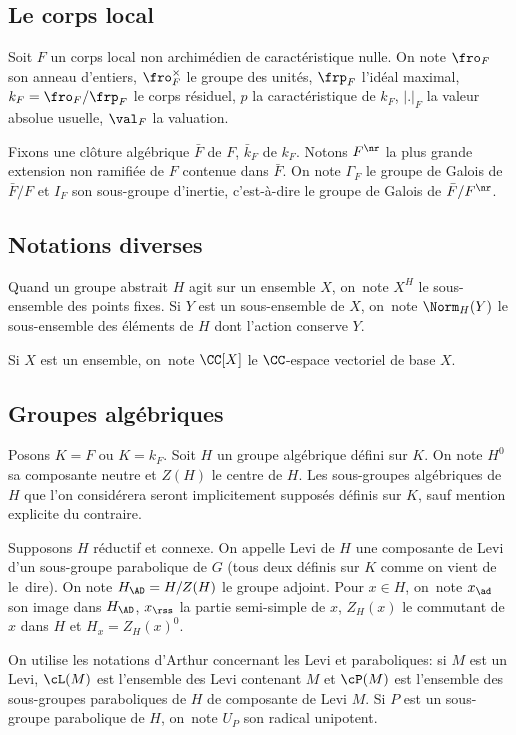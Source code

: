 \subsection{Le corps local}

Soit $F$ un corps local non archimédien de caractéristique nulle. On note $\fro_{F}$ son anneau d'entiers, $\fro_{F}^{\times}$ le groupe des unités, $ \frp_{F}$ l'idéal maximal, $k_{F}=\fro_{F}/\frp_{F}$ le corps résiduel, $p$ la caractéristique de $k_{F}$, $\vert .\vert _{F}$ la valeur absolue usuelle, $\val_{F}$ la valuation.

Fixons une clôture algébrique $\bar{F}$ de $F$, \resp $\bar{k}_{F}$ de $k_{F}$. Notons $F^{\nr}$ la plus grande extension non ramifiée de $F$ contenue dans $\bar{F}$. On note $\Gamma_{F}$ le groupe de Galois de $\bar{F}/ F$ et $I_{F}$ son sous-groupe d'inertie, c'est-à-dire le groupe de Galois de $\bar{F}/F^{\nr}$.

\subsection{Notations diverses}

Quand un groupe abstrait $H$ agit sur un ensemble $X$, on~note $X^{H}$ le sous-ensemble des points fixes. Si $Y$ est un sous-ensemble de $X$, on~note $\Norm_{H}(Y)$ le sous-ensemble des éléments de $H$ dont l'action conserve $Y$.

Si $X$ est un ensemble, on~note $\CC[X]$ le $\CC$-espace vectoriel de base $X$.

\subsection{Groupes algébriques}\label{groupesalgebriques}

Posons $K=F$ ou $K=k_{F}$. Soit $H$ un groupe algébrique défini sur $K$. On note $H^0$ sa composante neutre et $Z(H)$ le centre de $H$. Les sous-groupes algébriques de $H$ que l'on considérera seront implicitement supposés définis sur $K$, sauf mention explicite du contraire.

Supposons $H$ réductif et connexe. On appelle Levi de $H$ une composante de Levi d'un sous-groupe parabolique de $G$ (tous deux définis sur $K$ comme on vient de le~dire). On note $H_{\AD}=H/Z(H)$ le groupe adjoint. Pour $x\in H$, on~note $x_{\ad}$ son image dans $H_{\AD}$, $x_{\rss}$ la partie semi-simple de $x$, $Z_{H}(x)$ le commutant de $x$ dans $H$ et $H_{x}=Z_{H}(x)^0$.

On utilise les notations d'Arthur concernant les Levi et paraboliques: si $M$ est un Levi, $\cL(M)$ est l'ensemble des Levi contenant $M$ et $\cP(M)$ est l'ensemble des sous-groupes paraboliques de $H$ de composante de Levi $M$. Si $P$ est un sous-groupe parabolique de $H$, on~note $U_{P}$ son radical unipotent.

